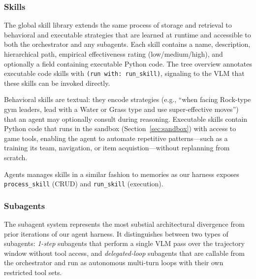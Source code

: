 \subsubsection{Skills}\label{sec:skills}

The global skill library extends the same process of storage and retrieval to behavioral and executable strategies that are learned at runtime and accessible to both the orchestrator and any subagents. Each skill contains a name, description, hierarchical path, empirical effectiveness rating (low/medium/high), and optionally a field containing executable Python code. The tree overview annotates executable code skills with \texttt{(run with: run\_skill)}, signaling to the VLM that these skills can be invoked directly.

Behavioral skills are textual: they encode strategies (e.g., ``when facing Rock-type gym leaders, lead with a Water or Grass type and use super-effective moves'') that an agent may optionally consult during reasoning. Executable skills contain Python code that runs in the sandbox (Section~\ref{sec:sandbox}) with access to game tools, enabling the agent to automate repetitive patterns---such as a training its team, navigation, or item acquistion---without replanning from scratch.

Agents manages skills in a similar fashion to memories as our harness exposes \texttt{process\_skill} (CRUD) and \texttt{run\_skill} (execution). 


\subsubsection{Subagents}\label{sec:subagents}

The subagent system represents the most substial architectural divergence from prior iterations of our agent harness. It distinguishes between two types of subagents: \emph{1-step} subagents that perform a single VLM pass over the trajectory window without tool access, and \emph{delegated-loop} subagents that are callable from the orchestrator and run as autonomous multi-turn loops with their own restricted tool sets.

